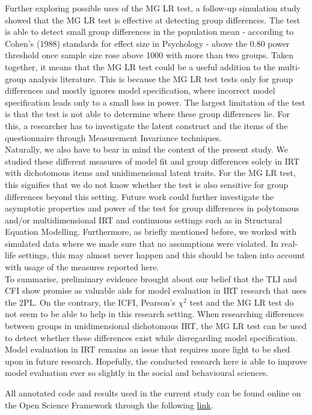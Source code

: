 \documentclass[Royal,sageapa,times,doublespace]{sagej}
\begin{document}
\indent Further exploring possible uses of the MG LR test, a follow-up simulation study showed that the MG LR test is effective at detecting group differences. The test is able to detect small group differences in the population mean - according to Cohen's (1988) standards for effect size in Psychology - above the 0.80 power threshold once sample size rose above 1000 with more than two groups. Taken together, it means that the MG LR test could be a useful addition to the multi-group analysis literature. This is because the MG LR test tests only for group differences and mostly ignores model specification, where incorrect model specification leads only to a small loss in power. The largest limitation of the test is that the test is not able to determine where these group differences lie. For this, a researcher has to investigate the latent construct and the items of the questionnaire through Measurement Invariance techniques. \\
\indent Naturally, we also have to bear in mind the context of the present study. We studied these different measures of model fit and group differences solely in IRT with dichotomous items and unidimensional latent traits. For the MG LR test, this signifies that we do not know whether the test is also sensitive for group differences beyond this setting. Future work could further investigate the asymptotic properties and power of the test for group differences in polytomous and/or multidimensional IRT and continuous settings such as in Structural Equation Modelling. Furthermore, as briefly mentioned before, we worked with simulated data where we made sure that no assumptions were violated. In real-life settings, this may almost never happen and this should be taken into account with usage of the measures reported here. \\ %
\indent To summarise, preliminary evidence brought about our belief that the TLI and CFI show promise as valuable aids for model evaluation in IRT research that uses the 2PL. On the contrary, the ICFI, Pearson's $\chi^2$ test and the MG LR test do not seem to be able to help in this research setting. When researching differences between groups in unidimensional dichotomous IRT, the MG LR test can be used to detect whether these differences exist while disregarding model specification. Model evaluation in IRT remains an issue that requires more light to be shed upon in future research. Hopefully, the conducted research here is able to improve model evaluation ever so slightly in the social and behavioural sciences. 


\begin{sm}
All annotated code and results used in the current study can be found online on the Open Science Framework through the following \href{https://osf.io/dtbcr/?view_only=e32e5f8a43124434b5a53a44ff26ad23}{link}.
\end{sm}

%
%
\end{document}
